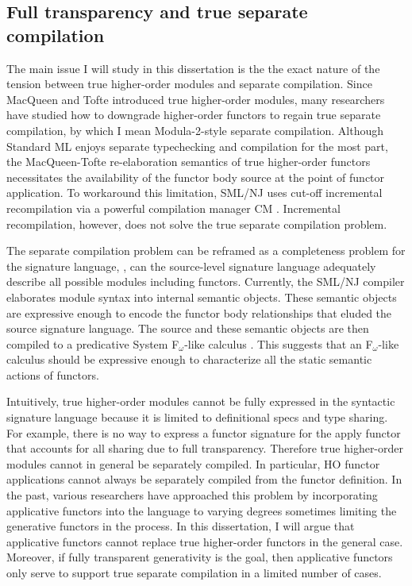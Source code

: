 \documentclass[12pt]{article}
\begin{document}
\subsection{Full transparency and true separate compilation}
		The main issue I will study in this dissertation is the the exact nature of the tension between true higher-order modules and separate compilation. Since MacQueen and Tofte introduced true higher-order modules, many researchers \cite{leroy94,russothesis,mixml} have studied how to downgrade higher-order functors to regain true separate compilation, by which I mean Modula-2-style separate compilation. Although Standard ML enjoys separate typechecking and compilation for the most part, the MacQueen-Tofte re-elaboration semantics of true higher-order functors necessitates the availability of the functor body source at the point of functor application. To workaround this limitation, SML/NJ uses cut-off incremental recompilation \cite{am:pldi94,hlpr:tr94} via a powerful compilation manager CM \cite{blume95:cm}. Incremental recompilation, however, does not solve the true separate compilation problem. 
		
		The separate compilation problem can be reframed as a completeness problem for the signature language, \ie, can the source-level signature language adequately describe all possible modules including functors. Currently, the SML/NJ compiler elaborates module syntax into internal semantic objects. These semantic objects are expressive enough to encode the functor body relationships that eluded the source signature language. The source and these semantic objects are then compiled to a predicative System F$_\omega$-like calculus \cite{shao98}. This suggests that an F$_\omega$-like calculus should be expressive enough to characterize all the static semantic actions of functors. 
		
		Intuitively, true higher-order modules cannot be fully expressed in the syntactic signature language because it is limited to definitional specs and type sharing. For example, there is no way to express a functor signature for the apply functor that accounts for all sharing due to full transparency. Therefore true higher-order modules cannot in general be separately compiled. In particular, HO functor applications cannot always be separately compiled from the functor definition. In the past, various researchers have approached this problem by incorporating applicative functors into the language to varying degrees \cite{leroy95,biswas95,russothesis,dhc03} sometimes limiting the generative functors in the process. In this dissertation, I will argue that applicative functors cannot replace true higher-order functors in the general case. Moreover, if fully transparent generativity is the goal, then applicative functors only serve to support true separate compilation in a limited number of cases. 
		
\end{document}
